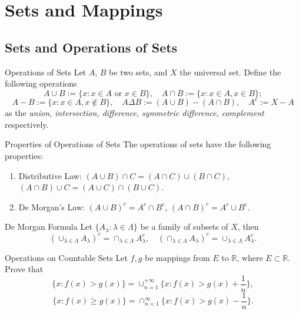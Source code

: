 
\section{Sets and Mappings}

\subsection{Sets and Operations of Sets}

\begin{definition}{Operations of Sets}{}
  Let $A$, $B$ be two sets,
  and $X$ the universal set.
  Define the following operations
  \begin{equation}
    A \cup B := \{x: x \in A \text{ or } x \in B\}, \quad
    A \cap B := \{x: x \in A, x \in B\};
  \end{equation}
  \begin{equation}
    A - B := \{x: x \in A, x \not\in B\}, \quad
    A \Delta B := (A \cup B) - (A \cap B), \quad
    A^c := X - A
  \end{equation}
  as the \emph{union, intersection, difference, symmetric difference, complement} respectively.
\end{definition}

\begin{proposition}{Properties of Operations of Sets}{}
  The operations of sets have the following properties:
  \begin{enumerate}
  \item Distributive Law: $(A \cup B)\cap C = (A \cap C) \cup (B \cap C)$,
    $(A \cap B) \cup C = (A \cup C) \cap (B \cup C)$.
  \item De Morgan's Law: $(A\cup B)^c = A^c \cap B^c$, $(A \cap B)^c = A^c \cup B^c$.
  \end{enumerate}
\end{proposition}

\begin{theorem}{De Morgan Formula}{}
  Let $\{A_{\lambda}: \lambda \in \Lambda\}$ be a family of subsets of $X$, then
  \begin{equation}
    \left(\cup_{\lambda\in\Lambda}A_{\lambda}\right)^{c}=\cap_{\lambda\in\Lambda}A_{\lambda}^{c},\quad\left(\cap_{\lambda\in\Lambda}A_{\lambda}\right)^{c}=\cup_{\lambda\in\Lambda}A_{\lambda}^{c}.
  \end{equation}
\end{theorem}

\begin{example}{Operations on Countable Sets}{}
  Let $f, g$ be mappings from $E$ to $\mathbb{R}$, where $E \subset \mathbb{R}$.
  Prove that
  \begin{equation}
    \{x: f(x) > g(x) \} = \cup _{n=1}^{+\infty} \{x: f(x) > g(x) + \frac{1}{n}\},
  \end{equation}
  \begin{equation}
    \{x: f(x) \geq g(x)\} = \cap _{n = 1}^{\infty} \{x: f(x) > g(x) - \frac{1}{n}\}.
  \end{equation}
\end{example}


